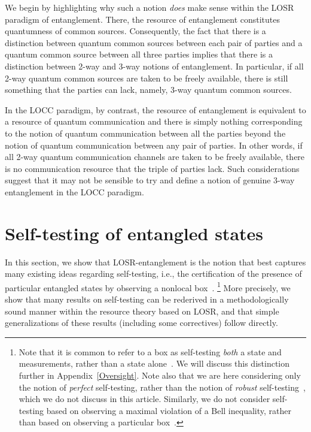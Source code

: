 \documentclass[12pt]{article}
\theoremstyle{plain}
\theoremstyle{definition}
\begin{document}
We begin by highlighting why such a notion {\em does} make sense within the LOSR paradigm of entanglement.  There, 
the resource of entanglement constitutes quantumness of common sources.
Consequently, the fact that there is a distinction between quantum common sources between each pair of parties
 and a quantum common source between 
  all three parties implies that there is a distinction between 2-way and 3-way notions of entanglement.  In particular, if all 2-way quantum common sources
   are taken to be freely available, there is still something that the parties can lack, namely, 3-way quantum common sources.

 In the LOCC paradigm, by contrast, the resource of entanglement is equivalent to a resource of quantum communication 
  and there is simply nothing corresponding to the notion of quantum communication between all the parties beyond the notion of quantum communication between any pair of parties.  In other words, if all 2-way quantum communication channels are taken to be freely available, there is no communication resource that the triple of parties lack.  Such considerations suggest that it may not be sensible to try and define a notion of genuine 3-way entanglement in the LOCC paradigm.

\section{Self-testing of entangled states}\label{sec:selftesting}

In this section, we show that LOSR-entanglement is the notion that best captures many existing ideas regarding self-testing,
  i.e., the certification of the presence of particular entangled states by observing a nonlocal box~\cite{mayers1998quantum,mayers2003self,vsupic2020self,Scarani2019}.
  \footnote{
  Note that it is common to refer to a box as self-testing {\em both} a state and measurements, rather than a state alone~\cite{vsupic2020self,JedWeak2020,ScaraniStateSelfTest2009}.  We will discuss this distinction further in Appendix~\ref{Oversight}. Note also that we are here considering only the notion of {\em perfect} self-testing, rather than the notion of {\em robust} self-testing~\cite{McKague2012,Yang2013selftesting,vsupic2020self,Scarani2019}, which we do not discuss in this article.  Similarly, we do not consider self-testing based on observing a maximal violation of a Bell inequality, rather than based on observing a particular box~\cite{ScaraniStateSelfTest2009,Bamps2015selftesting,Baccari2020}.} 
  More precisely, we show that many results on self-testing can be rederived in a methodologically sound manner within the resource theory based on LOSR, and that simple generalizations of these results (including some correctives) follow directly.
\end{document}
